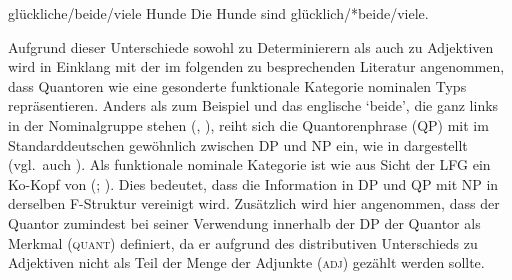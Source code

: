 \begin{exe}
\label{ex:beidedet}
\ex \begin{xlist}
		\label{ex:beidedet_1}
		\label{ex:beidedet_2}
		\label{ex:beidedet_3}
		\label{ex:beidedet_4}
\end{xlist}

\ex \begin{xlist}
	\ex glückliche/beide/viele Hunde
		\label{ex:beidepred_1}
	\ex Die Hunde sind glücklich/*beide/viele.
		\label{ex:beidepred_2}
\end{xlist}
\end{exe}

Aufgrund dieser Unterschiede sowohl zu  Determinierern als auch zu
Adjektiven wird in Einklang mit der im folgenden zu
besprechenden Literatur angenommen, dass Quantoren wie  eine
gesonderte funktionale Kategorie  nominalen Typs repräsentieren.
Anders als zum Beispiel  und das englische 
`beide', die ganz links in der Nominalgruppe stehen (,
), reiht sich die Quantorenphrase (QP) mit  im
Standarddeutschen gewöhnlich zwischen DP und NP ein, wie in
 dargestellt (vgl.~auch \cite[44--45 mit Fußnote
30]{lyons1999}). Als funktionale nominale Kategorie ist  wie 
aus Sicht der LFG ein Ko-Kopf von  (;
\cite[124]{bresnanetal2016}). Dies bedeutet, dass die Information in DP und QP
mit NP in derselben F-Struktur vereinigt wird. Zusätzlich wird hier angenommen,
dass der Quantor zumindest bei seiner Verwendung innerhalb der DP der Quantor
als Merkmal (\textsc{quant}) definiert, da er aufgrund des distributiven
Unterschieds zu Adjektiven nicht als Teil der Menge der Adjunkte
(\textsc{adj}) gezählt werden sollte.

